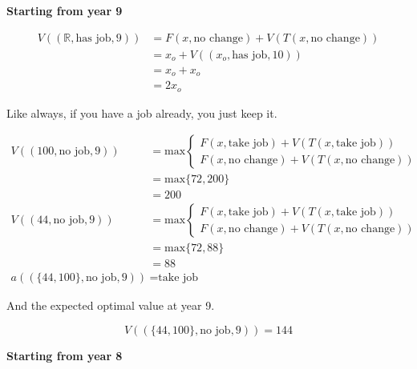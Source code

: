 \documentclass[a4paper, 12pt]{article}
\begin{document}
\textbf{Starting from year 9}

\[
\begin{aligned}
  V((\mathbb{R}, \text{has job}, 9)) &= F(x, \text{no change}) +
  V(T(x, \text{no change})) \\
                                &= x_{o} + V((x_{o}, \text{has job}, 10)) \\
                                &= x_{o} + x_{o} \\
                                &= 2x_{o}
\end{aligned}
\]

Like always, if you have a job already, you just keep it.

\[
\begin{aligned}
  V((100, \text{no job}, 9)) &= \text{max} \begin{cases}
    F(x, \text{take job}) + V(T(x, \text{take job})) \\
    F(x, \text{no change}) + V(T(x, \text{no change}))
  \end{cases} \\
                             &= \text{max} \{72, 200\} \\
                             &= 200 \\
  V((44, \text{no job}, 9)) &= \text{max} \begin{cases}
    F(x, \text{take job}) + V(T(x, \text{take job})) \\
    F(x, \text{no change}) + V(T(x, \text{no change}))
  \end{cases} \\
                            &= \text{max} \{72, 88\} \\
                            &= 88 \\
  a((\{44, 100\}, \text{no job}, 9)) &= \text{take job}
\end{aligned}
\]

And the expected optimal value at year 9.

\[
  V((\{44, 100\}, \text{no job}, 9)) = 144
\]

\textbf{Starting from year 8}
\end{document}
